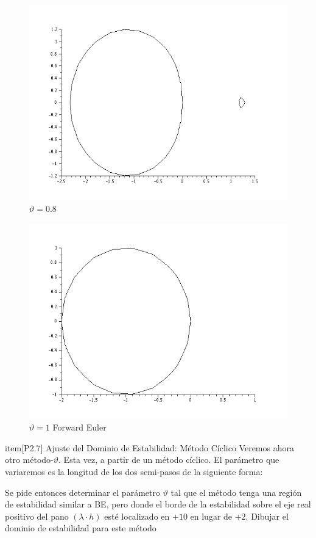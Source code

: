 \documentclass{article}
\begin{document}
\begin{itemize}
\begin{figure}[H]
\includegraphics[width=\textwidth]{img/ej6-11.png}
\caption{$\vartheta = 0.8$}
\end{figure}

\begin{figure}[H]
\includegraphics[width=\textwidth]{img/ej6-12.png}
\caption{$\vartheta = 1$ Forward Euler}
\end{figure}










item[P2.7] Ajuste del Dominio de Estabilidad: Método Cíclico Veremos ahora otro método-$\vartheta$. Esta vez, a partir de un método cíclico. El parámetro que variaremos es la longitud de los dos semi-pasos de la siguiente forma:


Se pide entonces determinar el parámetro $\vartheta$ tal que el método tenga una región de estabilidad similar a BE, pero donde el borde de la estabilidad sobre el eje real positivo del pano $(\lambda \cdot h)$ esté localizado en $+10$ en lugar de $+2$.
Dibujar el dominio de estabilidad para este método
\end{itemize}
\end{document}

